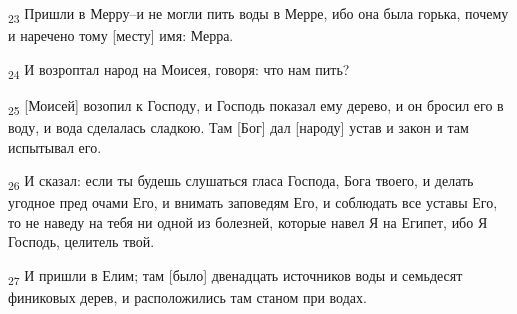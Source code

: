 \begin{tcolorbox}
\textsubscript{23} Пришли в Мерру--и не могли пить воды в Мерре, ибо она была горька, почему и наречено тому [месту] имя: Мерра.
\end{tcolorbox}
\begin{tcolorbox}
\textsubscript{24} И возроптал народ на Моисея, говоря: что нам пить?
\end{tcolorbox}
\begin{tcolorbox}
\textsubscript{25} [Моисей] возопил к Господу, и Господь показал ему дерево, и он бросил его в воду, и вода сделалась сладкою. Там [Бог] дал [народу] устав и закон и там испытывал его.
\end{tcolorbox}
\begin{tcolorbox}
\textsubscript{26} И сказал: если ты будешь слушаться гласа Господа, Бога твоего, и делать угодное пред очами Его, и внимать заповедям Его, и соблюдать все уставы Его, то не наведу на тебя ни одной из болезней, которые навел Я на Египет, ибо Я Господь, целитель твой.
\end{tcolorbox}
\begin{tcolorbox}
\textsubscript{27} И пришли в Елим; там [было] двенадцать источников воды и семьдесят финиковых дерев, и расположились там станом при водах.
\end{tcolorbox}
